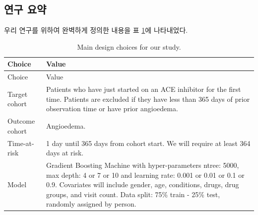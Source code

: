 \documentclass[11pt]{book}
\theoremstyle{definition}
\theoremstyle{definition}
\theoremstyle{definition}
\theoremstyle{remark}
\begin{document}
\subsection{연구 요약}\label{-}

우리 연구를 위하여 완벽하게 정의한 내용을 표 \ref{tab:plpSummary}에
나타내었다.

\begin{longtable}[]{@{}ll@{}}
\caption{\label{tab:plpSummary} Main design choices for our
study.}\tabularnewline
\toprule
\begin{minipage}[b]{0.23\columnwidth}\raggedright\strut
Choice\strut
\end{minipage} & \begin{minipage}[b]{0.71\columnwidth}\raggedright\strut
Value\strut
\end{minipage}\tabularnewline
\midrule
\endfirsthead
\toprule
\begin{minipage}[b]{0.23\columnwidth}\raggedright\strut
Choice\strut
\end{minipage} & \begin{minipage}[b]{0.71\columnwidth}\raggedright\strut
Value\strut
\end{minipage}\tabularnewline
\midrule
\endhead
\begin{minipage}[t]{0.23\columnwidth}\raggedright\strut
Target cohort\strut
\end{minipage} & \begin{minipage}[t]{0.71\columnwidth}\raggedright\strut
Patients who have just started on an ACE inhibitor for the first time.
Patients are excluded if they have less than 365 days of prior
observation time or have prior angioedema.\strut
\end{minipage}\tabularnewline
\begin{minipage}[t]{0.23\columnwidth}\raggedright\strut
Outcome cohort\strut
\end{minipage} & \begin{minipage}[t]{0.71\columnwidth}\raggedright\strut
Angioedema.\strut
\end{minipage}\tabularnewline
\begin{minipage}[t]{0.23\columnwidth}\raggedright\strut
Time-at-risk\strut
\end{minipage} & \begin{minipage}[t]{0.71\columnwidth}\raggedright\strut
1 day until 365 days from cohort start. We will require at least 364
days at risk.\strut
\end{minipage}\tabularnewline
\begin{minipage}[t]{0.23\columnwidth}\raggedright\strut
Model\strut
\end{minipage} & \begin{minipage}[t]{0.71\columnwidth}\raggedright\strut
Gradient Boosting Machine with hyper-parameters ntree: 5000, max depth:
4 or 7 or 10 and learning rate: 0.001 or 0.01 or 0.1 or 0.9. Covariates
will include gender, age, conditions, drugs, drug groups, and visit
count. Data split: 75\% train - 25\% test, randomly assigned by
person.\strut
\end{minipage}\tabularnewline
\bottomrule
\end{longtable}
\end{document}
